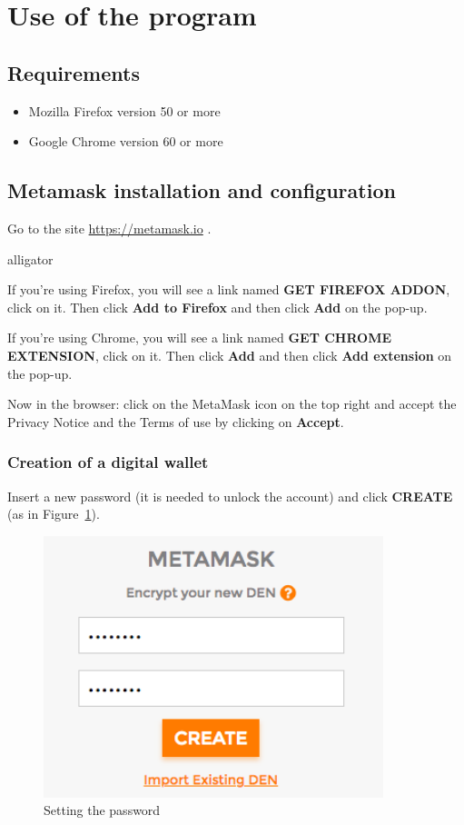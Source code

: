 \section{Use of the program}
\subsection{Requirements}
\begin{itemize}
	\item Mozilla Firefox version 50 or more
	\item Google Chrome version 60 or more
\end{itemize}

\subsection{Metamask installation and configuration}
Go to the site \url{https://metamask.io} . 

\begin{labeling}{alligator}
	\item If you're using Firefox, you will see a link named \textbf{GET FIREFOX ADDON}, click on it. Then click \textbf{Add to Firefox} and then click \textbf{Add} on the pop-up.
	\item If you're using Chrome, you will see a link named \textbf{GET CHROME EXTENSION}, click on it. Then click \textbf{Add} and then click \textbf{Add extension} on the pop-up.
\end{labeling}
Now in the browser: click on the MetaMask icon on the top right and accept the Privacy Notice and the Terms of use by clicking on \textbf{Accept}.

\subsubsection{Creation of a digital wallet}
Insert a new password (it is needed to unlock the account) and click \textbf{CREATE} (as in Figure~\ref{fig:password}).
\begin{figure}[!h]
	\centering
	\includegraphics[height=3in]{img/password.png}
	\caption{Setting the password}
	\label{fig:password}
\end{figure}

